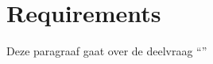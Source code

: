 \chapter{Requirements}

\label{chapter7}

Deze paragraaf gaat over de deelvraag \enquote{\deelrequirements}